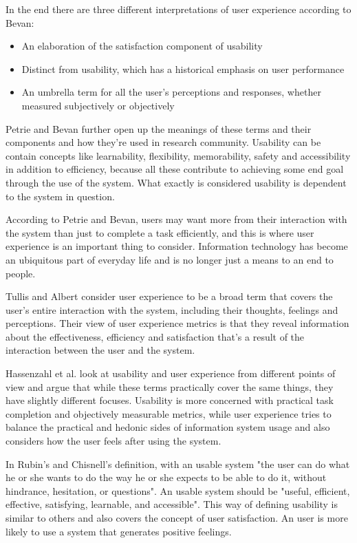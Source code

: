 In the end there are three different interpretations of user experience according to Bevan: \begin{itemize}
\item An  elaboration  of  the  satisfaction  component  of usability
\item Distinct  from  usability,  which  has  a  historical emphasis on user performance
\item An  umbrella  term  for  all  the  user’s  perceptions  and responses,  whether  measured  subjectively  or objectively
\end{itemize}
\cite{bevan2009difference}

Petrie and Bevan further open up the meanings of these terms and their components and how they're used in research community. Usability can be contain concepts like learnability, flexibility, memorability, safety and accessibility in addition to efficiency, because all these contribute to achieving some end goal through the use of the system. What exactly is considered usability is dependent to the system in question. 

According to Petrie and Bevan, users may want more from their interaction with the system than just to complete a task efficiently, and this is where user experience is an important thing to consider. Information technology has become an ubiquitous part of everyday life and is no longer just a means to an end to people.
\cite{bevanevaluation}

\cite{bevan2009difference, bevaniso, bevanevaluation, bevanstandard}

Tullis and Albert consider user experience to be a broad term that covers the user's entire interaction with the system, including their thoughts, feelings and perceptions. Their view of user experience metrics is that they reveal information about the effectiveness, efficiency and satisfaction that's a result of the interaction between the user and the system. \cite{albert2013measuring}

Hassenzahl et al. look at usability and user experience from different points of view and argue that while these terms practically cover the same things, they have slightly different focuses. Usability is more concerned with practical task completion and objectively measurable metrics, while user experience tries to balance the practical and hedonic sides of information system usage and also considers how the user feels after using the system.
\cite{hassenzahl2006user}

In Rubin's and Chisnell's definition, with an usable system "the user can do what he or she wants to do the way he or she expects to be able to do it, without hindrance, hesitation, or questions". An usable system should be "useful, efficient, effective, satisfying, learnable, and accessible". \cite{rubin2008handbook} This way of defining usability is similar to others and also covers the concept of user satisfaction. An user is more likely to use a system that generates positive feelings.

